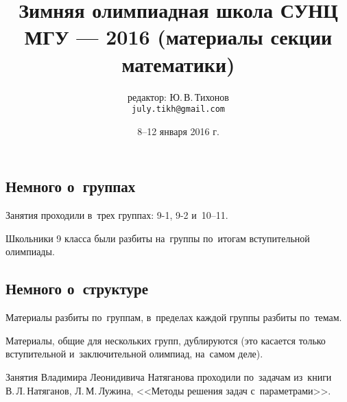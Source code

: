 


\begingroup
\providecommand\ifsourcelinks{\iffalse}
\providecommand\url[1]{\texttt{#1}}
\providecommand\href[2]{#2}

\title{%
    Зимняя олимпиадная школа СУНЦ МГУ --- 2016
    (материалы секции математики)}
\author{%
    редактор: Ю.\,В.\,Тихонов \\
    \texttt{\href{mailto:july.tikh@gmail.com}{july.tikh@gmail.com}}}
\date{8--12 января 2016 г.}

\maketitle

\subsection*{Немного о~группах}

Занятия проходили в~трех группах: 9-1, 9-2 и~10--11.

Школьники 9 класса были разбиты на~группы по~итогам вступительной олимпиады.

\subsection*{Немного о~структуре}

Материалы разбиты по~группам, в~пределах каждой группы разбиты по~темам.

Материалы, общие для нескольких групп, дублируются (это касается только
вступительной и~заключительной олимпиад, на~самом деле).
\ifsourcelinks
Все материалы сопровождаются ссылками на~исходные файлы \LaTeX.
\fi

Занятия Владимира Леонидивича Натяганова проходили по~задачам из~книги
\\
В.\,Л.\,Натяганов, Л.\,М.\,Лужина, <<Методы решения задач с~параметрами>>.

\endgroup %

